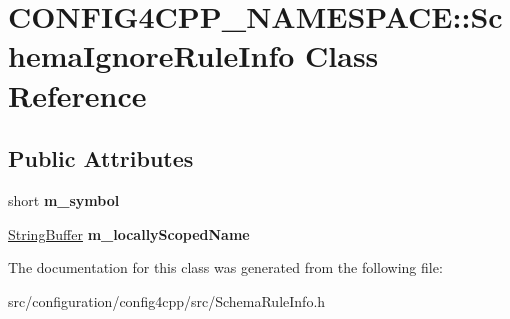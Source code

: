 \hypertarget{classCONFIG4CPP__NAMESPACE_1_1SchemaIgnoreRuleInfo}{\section{C\-O\-N\-F\-I\-G4\-C\-P\-P\-\_\-\-N\-A\-M\-E\-S\-P\-A\-C\-E\-:\-:Schema\-Ignore\-Rule\-Info Class Reference}
\label{classCONFIG4CPP__NAMESPACE_1_1SchemaIgnoreRuleInfo}
}
\subsection*{Public Attributes}
\begin{DoxyCompactItemize}
\item 
\hypertarget{classCONFIG4CPP__NAMESPACE_1_1SchemaIgnoreRuleInfo_a02b64ead0bef20fccddb8507838959c8}{short {\bfseries m\-\_\-symbol}}\label{classCONFIG4CPP__NAMESPACE_1_1SchemaIgnoreRuleInfo_a02b64ead0bef20fccddb8507838959c8}

\item 
\hypertarget{classCONFIG4CPP__NAMESPACE_1_1SchemaIgnoreRuleInfo_aab9c3ad5c4489b83344cca975b40517b}{\hyperlink{classCONFIG4CPP__NAMESPACE_1_1StringBuffer}{String\-Buffer} {\bfseries m\-\_\-locally\-Scoped\-Name}}\label{classCONFIG4CPP__NAMESPACE_1_1SchemaIgnoreRuleInfo_aab9c3ad5c4489b83344cca975b40517b}

\end{DoxyCompactItemize}


The documentation for this class was generated from the following file\-:\begin{DoxyCompactItemize}
\item 
src/configuration/config4cpp/src/Schema\-Rule\-Info.\-h\end{DoxyCompactItemize}
